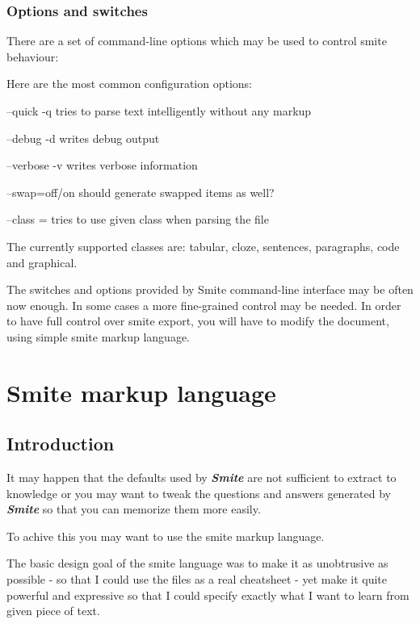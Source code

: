\documentclass[a4paper,11pt]{article}
\newcommand{\smite}{\emph{\textbf{Smite{}}}}
\begin{document}
\subsubsection{Options and switches}
There are a set of command-line options which may be used to control smite
behaviour:

Here are the most common configuration options:

--quick -q tries to parse text intelligently without any markup

--debug -d writes debug output

--verbose -v writes verbose information

--swap=off/on should generate swapped items as well?

--class = tries to use given class when parsing the file

The currently supported classes are: tabular, cloze, sentences, paragraphs,
code and graphical.

The switches and options provided by Smite command-line interface may be often
now enough. In some cases a more fine-grained control may be needed.
In order to have full control over smite export, you will have to modify the
document, using simple smite markup language.

\section{Smite markup language}
\subsection{Introduction}
It may happen that the defaults used by \smite{} are not sufficient to extract
to knowledge or you may want to tweak the questions and answers generated by
\smite{} so that you can memorize them more easily.

To achive this you may want to use the smite markup language.



The basic design goal of the smite language was to make it as unobtrusive as
possible - so that I could use the files as a real cheatsheet - yet make it
quite powerful and expressive so that I could specify exactly what I want to
learn from given piece of text.
\end{document}
